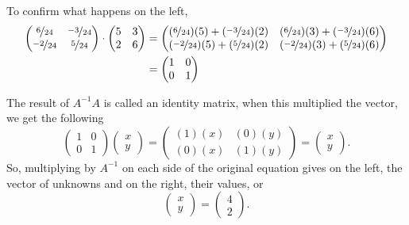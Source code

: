 \documentclass{article}
\begin{document}
To confirm what happens on the left, \begin{align*}
\begin{pmatrix}\nicefrac{6}{24}&\nicefrac{-3}{24}\\\nicefrac{-2}{24}&\nicefrac{5}{24}\end{pmatrix}\cdot \begin{pmatrix}5&3\\2&6\end{pmatrix} & = \begin{pmatrix}(\nicefrac{6}{24})(5) + (\nicefrac{-3}{24})(2) & (\nicefrac{6}{24})(3) + (\nicefrac{-3}{24})(6) \\(\nicefrac{-2}{24})(5) + (\nicefrac{5}{24})(2) & (\nicefrac{-2}{24})(3) + (\nicefrac{5}{24})(6)\end{pmatrix}\\
 & = \begin{pmatrix}1 & 0 \\0 & 1\end{pmatrix}\\
\end{align*}

The result of \(A^{-1}A\) is called an identity matrix, when this multiplied the vector, we get the following \[\begin{pmatrix}1 & 0 \\0 & 1\end{pmatrix}\begin{pmatrix}x \\y\end{pmatrix} = \begin{pmatrix}(1)(x) & (0)(y) \\(0)(x) & (1)(y)\end{pmatrix} = \begin{pmatrix}x\\y\end{pmatrix}.\] So, multiplying by \(A^{-1}\) on each side of the original equation gives on the left, the vector of unknowns and on the right, their values, or \[\begin{pmatrix}x\\y\end{pmatrix} = \begin{pmatrix}4\\2\end{pmatrix}.\]
\end{document}
